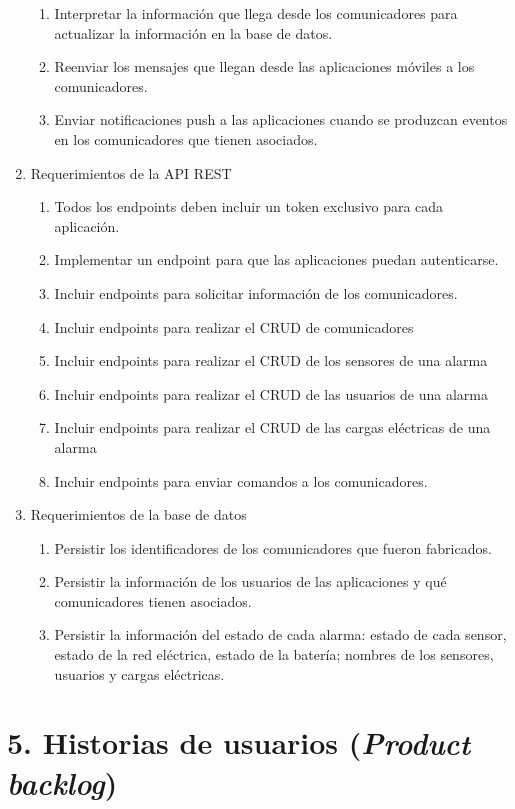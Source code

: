 \documentclass[
11pt, %
codirector, %
]{charter}
\begin{document}
\begin{enumerate}
\begin{enumerate}
			\item Interpretar la información que llega desde los comunicadores para actualizar la información en la base de datos.
			\item Reenviar los mensajes que llegan desde las aplicaciones móviles a los comunicadores.
			\item Enviar notificaciones push a las aplicaciones cuando se produzcan eventos en los comunicadores que tienen asociados.
		\end{enumerate}
	\item Requerimientos de la API REST
		\begin{enumerate}
			\item Todos los endpoints deben incluir un token exclusivo para cada aplicación.
			\item Implementar un endpoint para que las aplicaciones puedan autenticarse.
			\item Incluir endpoints para solicitar información de los comunicadores.
			\item Incluir endpoints para realizar el CRUD de comunicadores
			\item Incluir endpoints para realizar el CRUD de los sensores de una alarma
			\item Incluir endpoints para realizar el CRUD de las usuarios de una alarma
			\item Incluir endpoints para realizar el CRUD de las cargas eléctricas de una alarma
			\item Incluir endpoints para enviar comandos a los comunicadores.
		\end{enumerate}
	\item Requerimientos de la base de datos
		\begin{enumerate}
			\item Persistir los identificadores de los comunicadores que fueron fabricados.
			\item Persistir la información de los usuarios de las aplicaciones y qué comunicadores tienen asociados.
			\item Persistir la información del estado de cada alarma: estado de cada sensor, estado de la red eléctrica, estado de la batería; nombres de los sensores, usuarios y cargas eléctricas.
		\end{enumerate}

\end{enumerate}


\section{5. Historias de usuarios (\textit{Product backlog})}
\label{sec:backlog}
\end{document}
